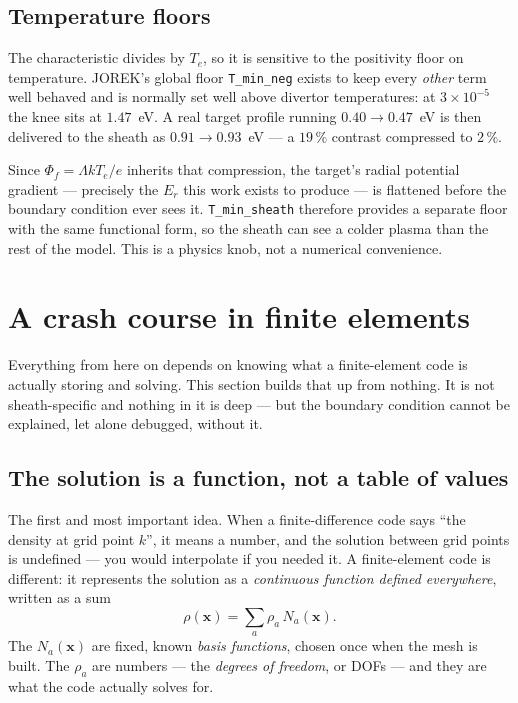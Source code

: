 \documentclass[11pt,a4paper]{article}
\newcommand{\code}[1]{\texttt{\small #1}}
\begin{document}
\subsection{Temperature floors}

The characteristic divides by $T_e$, so it is sensitive to the positivity floor on temperature.
JOREK's global floor \code{T\_min\_neg} exists to keep every \emph{other} term well behaved and is
normally set well above divertor temperatures: at $3\times10^{-5}$ the knee sits at $1.47$~eV. A real
target profile running $0.40\to0.47$~eV is then delivered to the sheath as $0.91\to0.93$~eV --- a
$19\,\%$ contrast compressed to $2\,\%$.

Since $\Phi_f=\Lambda kT_e/e$ inherits that compression, the target's radial potential gradient ---
precisely the $E_r$ this work exists to produce --- is flattened before the boundary condition ever
sees it. \code{T\_min\_sheath} therefore provides a separate floor with the same functional form, so
the sheath can see a colder plasma than the rest of the model. This is a physics knob, not a
numerical convenience.

\newpage
\section{A crash course in finite elements}

Everything from here on depends on knowing what a finite-element code is actually storing and
solving. This section builds that up from nothing. It is not sheath-specific and nothing in it is
deep --- but the boundary condition cannot be explained, let alone debugged, without it.

\subsection{The solution is a function, not a table of values}

The first and most important idea. When a finite-difference code says ``the density at grid point
$k$'', it means a number, and the solution between grid points is undefined --- you would interpolate
if you needed it. A finite-element code is different: it represents the solution as a
\emph{continuous function defined everywhere}, written as a sum
\begin{equation}
  \rho(\bm{x}) = \sum_{a} \rho_a\,N_a(\bm{x}).
  \label{eq:expansion}
\end{equation}
The $N_a(\bm{x})$ are fixed, known \emph{basis functions}, chosen once when the mesh is built. The
$\rho_a$ are numbers --- the \emph{degrees of freedom}, or DOFs --- and they are what the code
actually solves for.
\end{document}
